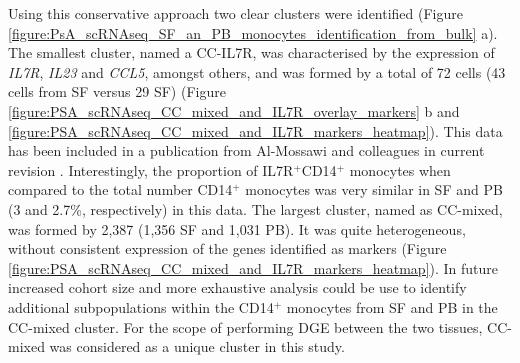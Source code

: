 Using this conservative approach two clear clusters were identified (Figure \ref{figure:PsA_scRNAseq_SF_an_PB_monocytes_identification_from_bulk} a). The smallest cluster, named a CC-IL7R, was characterised by the expression of \textit{IL7R}, \textit{IL23} and \textit{CCL5}, amongst others, and was formed by a total of 72 cells (43 cells from SF versus 29 SF) (Figure \ref{figure:PSA_scRNAseq_CC_mixed_and_IL7R_overlay_markers} b and \ref{figure:PSA_scRNAseq_CC_mixed_and_IL7R_markers_heatmap}). This data has been included in a publication from Al-Mossawi and colleagues in current revision \parencite{Al-Mossawi2018}. Interestingly, the proportion of IL7R$^+$CD14$^+$ monocytes when compared to the total number CD14$^+$ monocytes was very similar in SF and PB (3 and 2.7\%, respectively) in this data. The largest cluster, named as CC-mixed, was formed by 2,387 (1,356 SF and 1,031 PB). It was quite heterogeneous, without consistent expression of the genes identified as markers (Figure \ref{figure:PSA_scRNAseq_CC_mixed_and_IL7R_markers_heatmap}). In future increased cohort size and more exhaustive analysis could be use to identify additional subpopulations within the CD14$^+$ monocytes from SF and PB in the CC-mixed cluster. For the scope of performing DGE between the two tissues, CC-mixed was considered as a unique cluster in this study.

